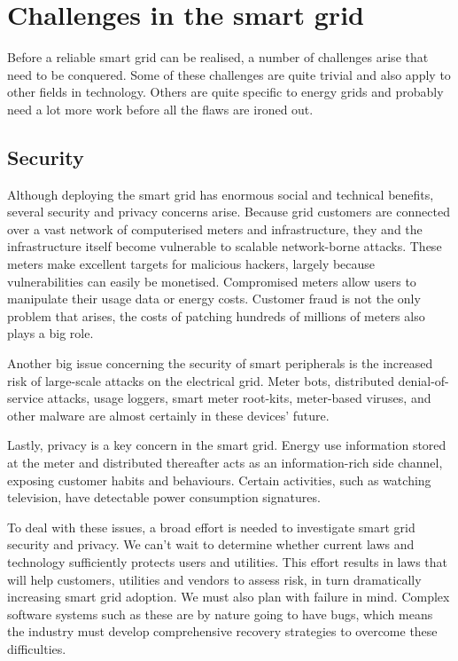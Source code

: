 \section{Challenges in the smart grid}
Before a reliable smart grid can be realised, a number of challenges arise that need to be conquered. Some of these challenges are quite trivial and also apply to other fields in technology. Others are quite specific to energy grids and probably need a lot more work before all the flaws are ironed out.
 
\subsection{Security}

Although deploying the smart grid has enormous social and technical benefits, several security and privacy concerns arise. Because grid customers are connected over a vast network of computerised meters and infrastructure, they and the infrastructure itself become vulnerable to scalable network-borne attacks. These meters make excellent targets for malicious hackers, largely because vulnerabilities can easily be monetised. Compromised meters allow users to manipulate their usage data or energy costs. Customer fraud is not the only problem that arises, the costs of patching hundreds of millions of meters also plays a big role. 

Another big issue concerning the security of smart peripherals is the increased risk of large-scale attacks on the electrical grid. Meter bots, distributed denial-of-service attacks, usage loggers, smart meter root-kits, meter-based viruses, and other malware are almost certainly in these devices’ future. 

Lastly, privacy is a key concern in the smart grid. Energy use information stored at the meter and distributed thereafter acts as an information-rich side channel, exposing customer habits and behaviours. Certain activities, such as watching television, have detectable power consumption signatures. 

To deal with these issues, a broad effort is needed to investigate smart grid security and privacy. We can’t wait to determine whether current laws and technology sufficiently protects users and utilities. This effort results in laws that will help customers, utilities and vendors to assess risk, in turn dramatically increasing smart grid adoption. We must also plan with failure in mind. Complex software systems such as these are by nature going to have bugs, which means the industry must develop comprehensive recovery strategies to overcome these difficulties. 


